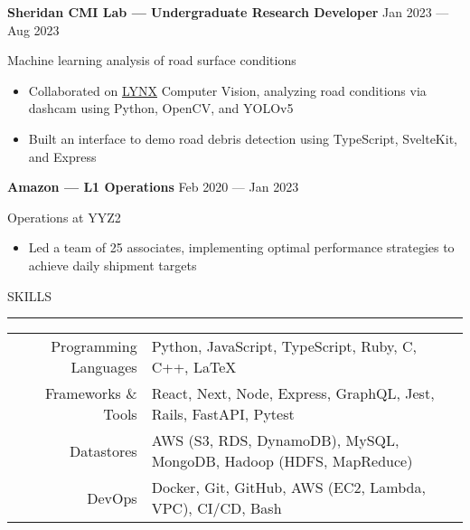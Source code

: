 \documentclass[9pt]{extarticle}
\begin{document}
\begin{adjustwidth}{10pt}{10pt}
	\vspace{-5pt}

	\textcolor{imptextblack}{\textbf{\large Sheridan CMI Lab — Undergraduate Research Developer}} \hfill Jan 2023 — Aug 2023
	
	Machine learning analysis of road surface conditions
	
	\begin{itemize}[topsep=0pt, labelsep=10pt, leftmargin=24pt, label=\textcolor{imptextblack}{\textbullet}]
		\item Collaborated on \href{https://github.com/Lynx-Data-Processing}{LYNX} Computer Vision, analyzing road conditions via dashcam using Python, OpenCV, and YOLOv5
		\item Built an interface to demo road debris detection using TypeScript, SvelteKit, and Express
	\end{itemize}
	
	\vspace{5pt}
	\textcolor{imptextblack}{\textbf{\large Amazon — L1 Operations}} \hfill Feb 2020 — Jan 2023
	
	Operations at YYZ2
	
	\begin{itemize}[topsep=0pt, labelsep=10pt, leftmargin=24pt, label=\textcolor{imptextblack}{\textbullet}]
		\item Led a team of \textcolor{imptextblack}{25} associates, implementing optimal performance strategies to achieve daily shipment targets
	\end{itemize}
\end{adjustwidth}


\vspace{5pt}

\begin{adjustwidth}{4pt}{4pt} \large \textrm{SKILLS} \end{adjustwidth}
\rule[8pt]{\linewidth}{0.4pt}

\begin{adjustwidth}{10pt}{10pt}
	\vspace{-4pt}

	\begin{adjustwidth}{18pt}{18pt}
		\begin{tabular}{ r l }
		 	\textcolor{imptextblack}{Programming Languages} & Python, JavaScript, TypeScript, Ruby, C, C++, \textrm{\LaTeX} \\ 
		 	\textcolor{imptextblack}{Frameworks \& Tools} & React, Next, Node, Express, GraphQL, Jest, Rails, FastAPI, Pytest \\  
		 	\textcolor{imptextblack}{Datastores} & AWS ({\small S3, RDS, DynamoDB}), MySQL, MongoDB, Hadoop ({\small HDFS, MapReduce}) \\  
		 	\textcolor{imptextblack}{DevOps} & Docker, Git, GitHub, AWS ({\small EC2, Lambda, VPC}), CI/CD, Bash \\  
		\end{tabular}
	\end{adjustwidth}
\end{adjustwidth}
\end{document}

